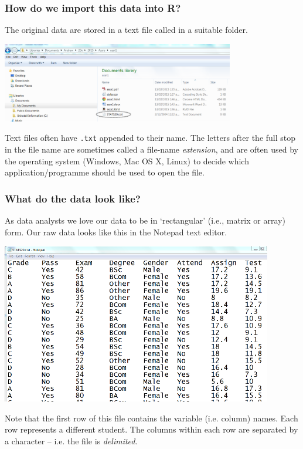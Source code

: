 \documentclass{beamer}\usepackage[]{graphicx}\usepackage[]{xcolor}
\begin{document}
\begin{frame}[fragile]
\frametitle{How do we import this data into R?}

The original data are stored in a text file called  in a suitable folder.

\begin{center}
\includegraphics[width=4in]{Pictures/WhereData}
\end{center}

Text files often have \texttt{.txt} appended to their name. The letters after the full stop in the file name are sometimes called a file-name \emph{extension}, and are often used by the operating system (Windows, Mac OS X, Linux) to decide which application/programme should be used to open the file.

\end{frame}


\begin{frame}[fragile]
\frametitle{What do the data look like?}
As data analysts we love our data to be in `rectangular' (i.e., matrix or array) form.
Our raw data looks like this in the Notepad text editor.
\vspace{-3mm}
\begin{center}
\includegraphics{Pictures/Stats20xdata}
\end{center}
\vspace{-3mm}
Note that the first row of this  file contains the variable (i.e. column) names.
Each row represents a different student. The columns within each row are separated by a   character -- i.e. the file is  \emph{ delimited}.

\end{frame}
\end{document}
